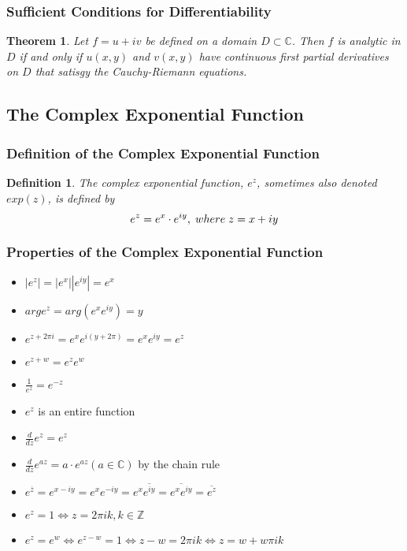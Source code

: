 \documentclass{article}
\newtheorem{theorem}{Theorem}[section]
\newtheorem{definition}{Definition}[section]
\begin{document}
\subsubsection{Sufficient Conditions for Differentiability}
\begin{theorem}
Let $f = u + iv$ be defined on a domain $D \subset \mathbb{C}$. Then $f$ is analytic in $D$ if and only if $u(x,y)$ and $v(x,y)$ have continuous first partial derivatives on $D$ that satisgy the Cauchy-Riemann equations.
\end{theorem}

\subsection{The Complex Exponential Function}

\subsubsection{Definition of the Complex Exponential Function}
\begin{definition}
The complex exponential function, $e^z$, sometimes also denoted $exp(z)$, is defined by 
\begin{equation*}
e^z = e^x \cdot e^{iy}, \hspace{0.1cm} where \hspace{0.1cm} z = x + iy
\end{equation*}
\end{definition}

\subsubsection{Properties of the Complex Exponential Function}
\begin{itemize}
\item $\left|e^z\right| = \left|e^x\right|\left|e^{iy}\right| = e^x$
\item $arg e^z = arg(e^xe^{iy}) = y$
\item $e^{z+2\pi i} = e^xe^{i(y+2\pi)} = e^xe^{iy} = e^z$
\item $e^{z+w} = e^ze^w$
\item $\frac{1}{e^z} = e^{-z}$
\item $e^z$ is an entire function
\item $\frac{d}{dz}e^z=e^z$
\item $\frac{d}{dz}e^{az} = a \cdot e^{az} (a \in \mathbb{C})$ by the chain rule
\item $e^{\overline{z}} = e^{x-iy} = e^xe^{-iy} = e^x\overline{e^{iy}} = \overline{e^xe^{iy}} = \overline{e^z}$
\item $e^z = 1 \iff z = 2\pi ik, k \in \mathbb{Z}$
\item $e^z = e^w \iff e^{z - w} = 1 \iff z - w = 2\pi ik \iff z = w + w\pi ik$
\end{itemize}
\end{document}
